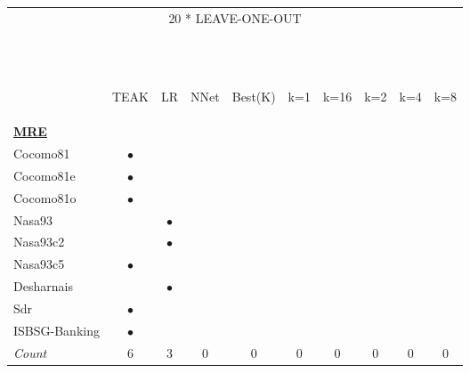\begin{figure*}[!t]
\renewcommand{\baselinestretch}{.5}
\centering
\small
  \begin{tabular}{lccccccccc|}
\multicolumn{10}{c}{20 * LEAVE-ONE-OUT }\\~\\~\\
&	\begin{sideways}\parbox{9mm}{TEAK}\end{sideways}	&	\begin{sideways}\parbox{9mm}{LR}\end{sideways}	&	\begin{sideways}\parbox{9mm}{NNet}\end{sideways}	&	\begin{sideways}\parbox{9mm}{Best(K)}\end{sideways}	&	\begin{sideways}\parbox{9mm}{k=1}\end{sideways}	&	\begin{sideways}\parbox{9mm}{k=16}\end{sideways}	&	\begin{sideways}\parbox{9mm}{k=2}\end{sideways}	&	\begin{sideways}\parbox{9mm}{k=4}\end{sideways}	&	\begin{sideways}\parbox{9mm}{k=8}\end{sideways}	\\\hline
\multicolumn{10}{l}{  \underline{{\bf MRE}}}	\\
Cocomo81	   &	$\bullet$ 	&		&		&	&		&		&		&		&		\\
Cocomo81e	    &	$\bullet$ 	&		&		&		&		&		&		&		&		\\
Cocomo81o	    &	$\bullet$ 	&		&		&		&		&		&		&		&		\\
Nasa93	        &	    &$\bullet$ 	&	&		&		&		&		&		&		\\
Nasa93c2	    &	     &$\bullet$	&	&		&		&		&		&		&		\\
Nasa93c5     	&	$\bullet$ 	 &		&	&		&		&		&		&		&		\\
Desharnais	    &		     &$\bullet$	&		&		&		&		&		&		&		\\
Sdr	            &	$\bullet$	  &		&		&		& 	&		&		&		&		\\
ISBSG-Banking	&	$\bullet$ 	 &		&		&		&		&		&		&		&		\\
\rowcolor{DarkGray}\em Count	&	$6$	&	$3$	 &	$0$	&	0	&	0	&	0	&	0	&	0	&	0	\\


\end{tabular}
\end{figure*}
